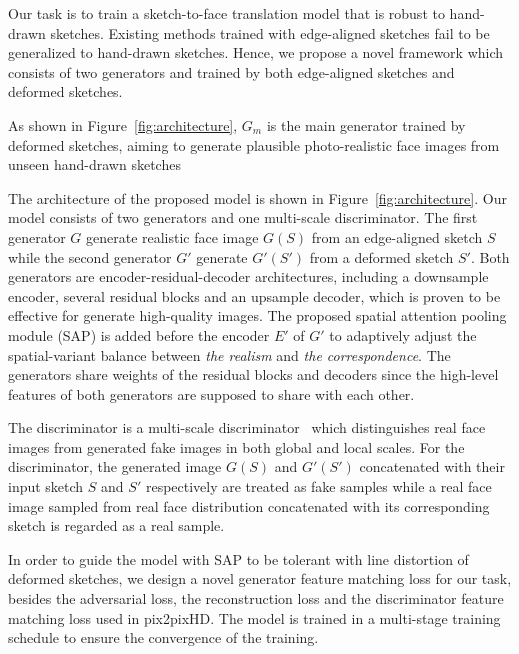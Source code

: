 % 

Our task is to train a sketch-to-face translation model that is robust to hand-drawn sketches. Existing methods trained with edge-aligned sketches fail to be generalized to hand-drawn sketches. Hence, we propose a novel framework which consists of two generators and trained by both edge-aligned sketches and deformed sketches.

As shown in Figure~\ref{fig:architecture}, $G_m$ is the main generator trained by deformed sketches, aiming to generate plausible photo-realistic face images from unseen hand-drawn sketches 

The architecture of the proposed model is shown in Figure~\ref{fig:architecture}.
Our model consists of two generators and one multi-scale discriminator.
The first generator $G$ generate realistic face image $G(S)$ from an edge-aligned sketch $S$ while the second generator $G'$ generate $G'(S')$ from a deformed sketch $S'$. 
Both generators are encoder-residual-decoder architectures, including a downsample encoder, several residual blocks and an upsample decoder, which is proven to be effective for generate high-quality images. 
The proposed spatial attention pooling module (SAP) is added before the encoder $E'$ of $G'$ to adaptively adjust the spatial-variant balance between \textit{the realism} and \textit{the correspondence}. 
The generators share weights of the residual blocks and decoders since the high-level features of both generators are supposed to share with each other.


%
The discriminator is a multi-scale discriminator~\cite{pix2pixHD} which distinguishes real face images from generated fake images in both global and local scales.
For the discriminator, the generated image $G(S)$ and $G'(S')$ concatenated with their input sketch $S$ and $S'$ respectively are treated as fake samples while a real face image sampled from real face distribution concatenated with its corresponding sketch is regarded as a real sample. 
%

In order to guide the model with SAP to be tolerant with line distortion of deformed sketches, we design a novel generator feature matching loss for our task, besides the adversarial loss, the reconstruction loss and the discriminator feature matching loss used in pix2pixHD. The model is trained in a multi-stage training schedule to ensure the convergence of the training.
%

